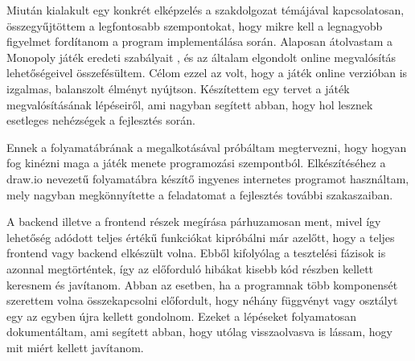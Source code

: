 

Miután kialakult egy konkrét elképzelés a szakdolgozat témájával kapcsolatosan, összegyűjtöttem a legfontosabb szempontokat, hogy mikre kell a legnagyobb figyelmet fordítanom a program implementálása során. Alaposan átolvastam a Monopoly játék eredeti szabályait \cite{coombs1987markup}, és az általam elgondolt online megvalósítás lehetőségeivel összefésültem. Célom ezzel az volt, hogy a játék online verzióban is izgalmas, balanszolt élményt nyújtson. Készítettem egy tervet a játék megvalósításának lépéseiről, ami nagyban segített abban, hogy hol lesznek esetleges nehézségek a fejlesztés során.

Ennek a folyamatábrának a megalkotásával próbáltam megtervezni, hogy hogyan fog kinézni maga a játék menete programozási szempontból. Elkészítéséhez a draw.io nevezetű folyamatábra készítő ingyenes internetes programot használtam, mely nagyban megkönnyítette a feladatomat a fejlesztés további szakaszaiban.

A backend illetve a frontend részek megírása párhuzamosan ment, mivel így lehetőség adódott teljes értékű funkciókat kipróbálni már azelőtt, hogy a teljes frontend vagy backend elkészült volna. Ebből kifolyólag a tesztelési fázisok is azonnal megtörténtek, így az előforduló hibákat kisebb kód részben kellett keresnem és javítanom. Abban az esetben, ha a programnak több komponensét szerettem volna összekapcsolni előfordult, hogy néhány függvényt vagy osztályt egy az egyben újra kellett gondolnom. Ezeket a lépéseket folyamatosan dokumentáltam, ami segített abban, hogy utólag visszaolvasva is lássam, hogy mit miért kellett javítanom.


